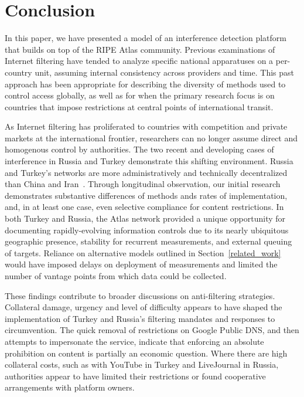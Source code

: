 \section{Conclusion}
\label{sec:conclusion}

In this paper, we have presented a model of an interference detection platform that builds on top of the RIPE Atlas community. Previous examinations of Internet filtering have tended to analyze specific national apparatuses on a per-country unit, assuming internal consistency across providers and time. This past approach has been appropriate for describing the diversity of methods used to control access globally, as well as for when the primary research focus is on countries that impose restrictions at central points of international transit. 

As Internet filtering has proliferated to countries with competition and private markets at the international frontier, researchers can no longer assume direct and homogenous control by authorities. The two recent and developing cases of interference in Russia and Turkey demonstrate this shifting environment. Russia and Turkey's networks are more administratively and technically decentralized than China and Iran~\cite{Roberts2011}. Through longitudinal observation, our initial research demonstrates substantive differences of methods ands rates of implementation, and, in at least one case, even selective compliance for content restrictions. In both Turkey and Russia, the Atlas network provided a unique opportunity for documenting rapidly-evolving information controls due to its nearly ubiquitous geographic presence, stability for recurrent measurements, and external queuing of targets. Reliance on alternative models outlined in Section~\ref{related_work} would have imposed delays on deployment of measurements and limited the number of vantage points from which data could be collected. 

These findings contribute to broader discussions on anti-filtering strategies.  Collateral damage, urgency and level of difficulty appears to have shaped the implementation of Turkey and Russia's filtering mandates and responses to circumvention. The quick removal of restrictions on Google Public DNS, and then attempts to impersonate the service, indicate that enforcing an absolute prohibition on content is partially an economic question. Where there are high collateral costs, such as with YouTube in Turkey and LiveJournal in Russia, authorities appear to have limited their restrictions or found cooperative arrangements with platform owners. 

